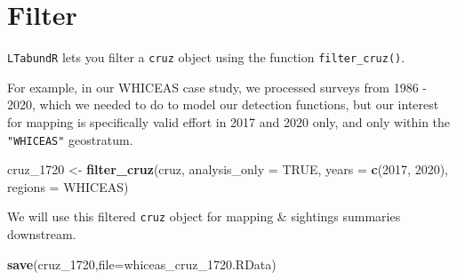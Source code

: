 \documentclass[
]{book}
\newenvironment{Shaded}{\begin{snugshade}}{\end{snugshade}}
\newcommand{\AttributeTok}[1]{\textcolor[rgb]{0.13,0.29,0.53}{#1}}
\newcommand{\ConstantTok}[1]{\textcolor[rgb]{0.56,0.35,0.01}{#1}}
\newcommand{\DecValTok}[1]{\textcolor[rgb]{0.00,0.00,0.81}{#1}}
\newcommand{\FloatTok}[1]{\textcolor[rgb]{0.00,0.00,0.81}{#1}}
\newcommand{\FunctionTok}[1]{\textcolor[rgb]{0.13,0.29,0.53}{\textbf{#1}}}
\newcommand{\NormalTok}[1]{#1}
\newcommand{\OtherTok}[1]{\textcolor[rgb]{0.56,0.35,0.01}{#1}}
\newcommand{\SpecialCharTok}[1]{\textcolor[rgb]{0.81,0.36,0.00}{\textbf{#1}}}
\newcommand{\StringTok}[1]{\textcolor[rgb]{0.31,0.60,0.02}{#1}}
\begin{document}
\begin{Shaded}
\end{Shaded}

\hypertarget{filter-1}{%
\section*{Filter}\label{filter-1}}

\texttt{LTabundR} lets you filter a \texttt{cruz} object using the function \texttt{filter\_cruz()}.

For example, in our WHICEAS case study, we processed surveys from 1986 - 2020, which we needed to do to model our detection functions, but our interest for mapping is specifically valid effort in 2017 and 2020 only, and only within the \texttt{"WHICEAS"} geostratum.

\begin{Shaded}
\begin{Highlighting}[]
\NormalTok{cruz\_1720 }\OtherTok{\textless{}{-}} 
  \FunctionTok{filter\_cruz}\NormalTok{(cruz,}
              \AttributeTok{analysis\_only =} \ConstantTok{TRUE}\NormalTok{,}
              \AttributeTok{years =} \FunctionTok{c}\NormalTok{(}\DecValTok{2017}\NormalTok{, }\DecValTok{2020}\NormalTok{),}
              \AttributeTok{regions =} \StringTok{\textquotesingle{}WHICEAS\textquotesingle{}}\NormalTok{)}
\end{Highlighting}
\end{Shaded}

We will use this filtered \texttt{cruz} object for mapping \& sightings summaries downstream.

\begin{Shaded}
\begin{Highlighting}[]
\FunctionTok{save}\NormalTok{(cruz\_1720,}\AttributeTok{file=}\StringTok{\textquotesingle{}whiceas\_cruz\_1720.RData\textquotesingle{}}\NormalTok{)}
\end{Highlighting}
\end{Shaded}
\end{document}
